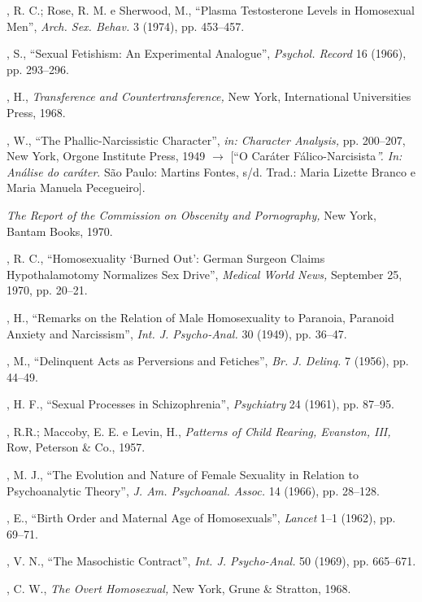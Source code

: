 \begin{description}
, R. C.; Rose, R. M. e Sherwood, M., ``Plasma Testosterone
Levels in Homosexual Men'', \textit{Arch. Sex. Behav. }3 (1974), pp.
453--457.

, S., ``Sexual Fetishism: An Experimental
Analogue'', \textit{Psychol. Record } 16 (1966), pp. 293--296.

, H., \textit{Transference and Countertransference, }New York,
International Universities Press, 1968.

, W., ``The Phallic-Narcissistic Character'',
\textit{in: Character Analysis, }pp. 200--207, New York, Orgone Institute Press,
1949 {$\bm{\rightarrow}$} [“O Caráter Fálico-Narcisista\textit{”. In: Análise do caráter}. São Paulo:
Martins Fontes, s/d. Trad.: Maria Lizette Branco e Maria Manuela Pecegueiro].

 \textit{The Report of the Commission on Obscenity and Pornography, }New York,
Bantam Books, 1970.

, R. C., ``Homosexuality `Burned
Out': German Surgeon Claims Hypothalamotomy Normalizes Sex
Drive'', \textit{Medical World News, }September 25, 1970, pp. 20--21.

, H., ``Remarks on the Relation of Male Homosexuality to
Paranoia, Paranoid Anxiety and Narcissism'', \textit{Int. J.
Psycho-Anal. } 30 (1949), pp. 36--47.

, M., ``Delinquent Acts as Perversions and
Fetiches'', \textit{Br. J. Delinq. }7 (1956), pp. 44--49.

, H. F., ``Sexual Processes in
Schizophrenia'', \textit{Psychiatry }24 (1961), pp. 87--95.

, R.R.; Maccoby, E. E. e Levin, H., \textit{Patterns of Child Rearing,
Evanston, III, }Row, Peterson \& Co., 1957.

, M. J., ``The Evolution and Nature of Female Sexuality in
Relation to Psychoanalytic Theory'', \textit{J. Am. Psychoanal.
Assoc. } 14 (1966), pp. 28--128.

, E., ``Birth Order and Maternal Age of
Homosexuals'', \textit{Lancet } 1--1 (1962), pp. 69--71.

, V. N., ``The Masochistic Contract'',
\textit{Int. J. Psycho-Anal. }50 (1969), pp. 665--671.

, C. W., \textit{The Overt Homosexual, }New York, Grune \& Stratton,
1968.


\end{description}
